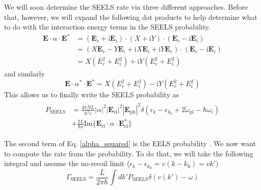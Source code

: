 \documentclass [11pt, proquest] {uwthesis}[2016/11/22]
\begin{document}
We will soon determine the SEELS rate via three different approaches. Before that, however, we will expand the following dot products to help determine what to do with the interaction energy terms in the SEELS probability.
\begin{equation}
\begin{aligned}
\textbf{E}\cdot\alpha\cdot\textbf{E}^* &= (\textbf{E}_r+\textrm{i}\textbf{E}_i)\cdot(X+\textrm{i}Y)\cdot(\textbf{E}_r-\textrm{i}\textbf{E}_i)\\
& = (X\textbf{E}_r - Y\textbf{E}_i + \textrm{i}X\textbf{E}_i + \textrm{i}Y\textbf{E}_r)\cdot(\textbf{E}_r-\textrm{i}\textbf{E}_i)\\
& = X(E_r^2 + E_i^2) + \textrm{i}Y(E_r^2 + E_i^2)
\label{alpha_1}
\end{aligned}
\end{equation}
and similarly 
\begin{equation}
\textbf{E}\cdot\alpha^*\cdot\textbf{E}^* = X(E_r^2 + E_i^2) -\textrm{i}Y(E_r^2 + E_i^2)
\label{alpha_2}
\end{equation}
This allows us to finally write the SEELS probability as
\begin{align}
\begin{split}
  P_{\textrm{SEELS}} &= \frac{4\pi NL}{\hbar^2v}|\alpha|^2|\textbf{E}_{\textrm{el}}|^2|\textbf{E}_{\textrm{ph}}|^2\delta(\epsilon_k - \epsilon_{k_0} + 2\tilde{\omega}_{\textrm{pl}} - \hbar\omega_i)\\
  &+ \frac{2L}{\hbar v}\textrm{Im}\{\textbf{E}_{\textrm{el}}\cdot\alpha\cdot\textbf{E}_{\textrm{el}}^*\}
  \label{alpha_squared}
  \end{split}
\end{align}

The second term of Eq. \ref{alpha_squared} is the EELS probability \cite{EEGS}. We now want to compute the rate from the probability. To do that, we will take the following integral and assume the no-recoil limit ($\epsilon_k - \epsilon_{k_0} = v(k-k_0) = vk'$)
\begin{equation}
\Gamma_{\textrm{SEELS}} = \frac{L}{2\pi\hbar}\int dk' P_{\textrm{SEELS}} \delta(v(k')-\omega)
\label{prob_to_rate}
\end{equation}
\end{document}
